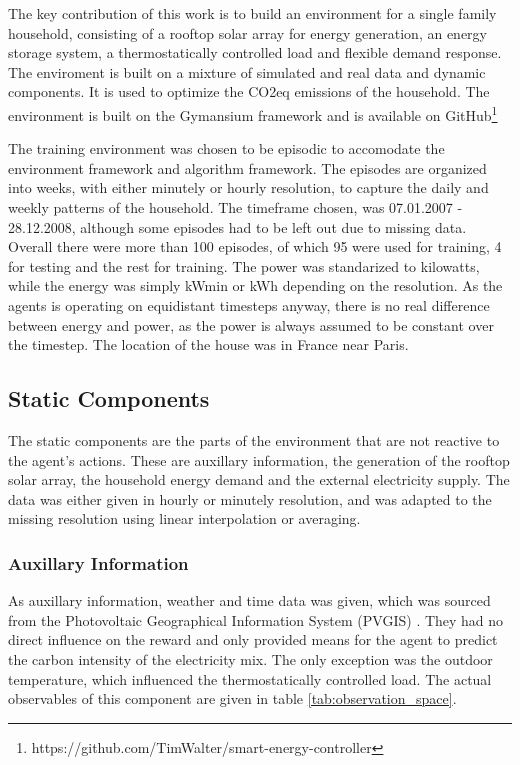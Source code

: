 The key contribution of this work is to build an environment for a single family household, consisting of a rooftop solar array for energy generation, an energy storage system, a thermostatically controlled load and flexible demand response. The enviroment is built on a mixture of simulated and real data and dynamic components. It is used to optimize the CO2eq emissions of the household. The environment is built on the Gymansium framework \cite{Towers.2023} and is available on GitHub\footnote{https://github.com/TimWalter/smart-energy-controller}
\par
The training environment was chosen to be episodic to accomodate the environment framework\cite{Towers.2023} and algorithm framework\cite{AntoninRaffin.2021}. The episodes are organized into weeks, with either minutely or hourly resolution, to capture the daily and weekly patterns of the household. The timeframe chosen, was 07.01.2007 - 28.12.2008, although some episodes had to be left out due to missing data. Overall there were more than 100 episodes, of which 95 were used for training, 4 for testing and the rest for training. The power was standarized to kilowatts, while the energy was simply kWmin or kWh depending on the resolution. As the agents is operating on equidistant timesteps anyway, there is no real difference between energy and power, as the power is always assumed to be constant over the timestep. The location of the house was in France near Paris.


\subsection{Static Components}\label{ssec:static_components}
The static components are the parts of the environment that are not reactive to the agent's actions. These are auxillary information, the generation of the rooftop solar array, the household energy demand and the external electricity supply. The data was either given in hourly or minutely resolution, and was adapted to the missing resolution using linear interpolation or averaging.

\subsubsection{Auxillary Information}\label{sssec:auxillary_information}
As auxillary information, weather and time data was given, which was sourced from the Photovoltaic Geographical Information System (PVGIS) \cite{ThomasHuld.2012}. They had no direct influence on the reward and only provided means for the agent to predict the carbon intensity of the electricity mix. The only exception was the outdoor temperature, which influenced the thermostatically controlled load. The actual observables of this component are given in table \ref{tab:observation_space}.

